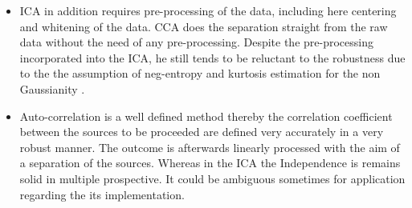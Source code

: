 \begin{itemize}
\item ICA in addition requires pre-processing  of the data, including here centering and whitening of the data\cite{15}. CCA does the separation straight from the raw data without the need of any pre-processing. Despite the pre-processing incorporated into the ICA, he still tends to be reluctant to the robustness due to the the assumption of neg-entropy and kurtosis estimation for the non Gaussianity \cite{17}. 

\item Auto-correlation is a well defined method thereby the correlation coefficient between the sources to be proceeded are defined very accurately in a very robust manner. The outcome is afterwards linearly processed with the aim of a separation of the sources. Whereas in the ICA the Independence is remains solid in multiple prospective. It could be ambiguous sometimes for application regarding the its implementation. 

\end{itemize}